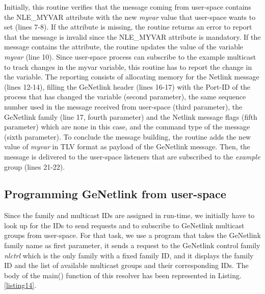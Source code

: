 \documentclass[10pt,onecolumn]{article}
\begin{document}
Initially, this routine verifies that the message coming from user-space contains the NLE\_MYVAR attribute with the new \textit{myvar} value that user-space wants to set (lines 7-8). If the attribute is missing, the routine returns an error to report that the message is invalid since the NLE\_MYVAR attribute is mandatory. If the message contains the attribute, the routine updates the value of the variable \textit{myvar} (line 10). Since user-space process can subscribe to the example multicast to track changes in the myvar variable, this routine has to report the change in the variable. The reporting consists of allocating memory for the Netlink message (lines 12-14), filling the GeNetlink header (lines 16-17) with the Port-ID of the process that has changed the variable (second parameter), the same sequence number used in the message received from user-space (third parameter), the GeNetlink family (line 17, fourth parameter) and the Netlink message flags (fifth parameter) which are none in this case, and the command type of the message (sixth parameter). To conclude the message building, the routine adds the new value of \textit{myvar} in TLV format as payload of the GeNetlink message. Then, the message is delivered to the user-space listeners that are subscribed to the \textit{example} group (lines 21-22).

\subsection{Programming GeNetlink from user-space}

Since the family and multicast IDs are assigned in run-time, we initially have to look up for the IDs to send requests and to subscribe to GeNetlink multicast groups from user-space. For that task, we use a program that takes the GeNetlink family name as first parameter, it sends a request to the GeNetlink control family \textit{nlctrl} which is the only family with a fixed family ID, and it displays the family ID and the list of available multicast groups and their corresponding IDs. The body of the main() function of this resolver has been represented in Listing. \ref{listing14}.
\end{document}
